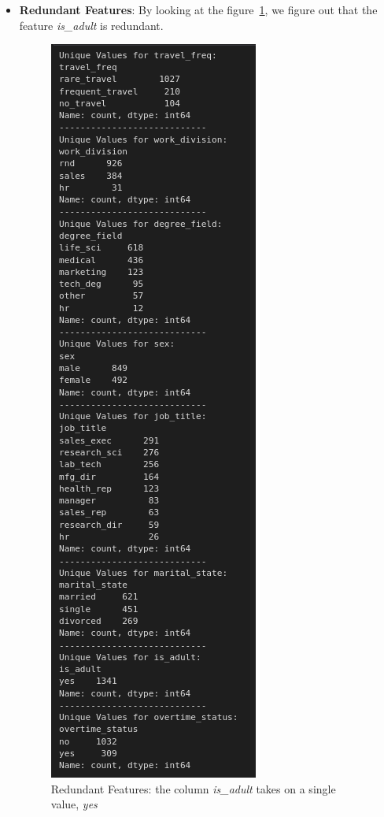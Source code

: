 \documentclass[a4paper,12pt]{article}
\begin{document}
\begin{itemize}
    \item \textbf{Redundant Features}: By looking at the figure~\ref{fig:fig_2}, we figure out that the feature \textit{is\_adult} is redundant.
    \begin{figure}[H]
    \centering
    \includegraphics[width=\textwidth, height=0.9\textheight, keepaspectratio]{./images/redundant_features.png}
    \caption{Redundant Features: the column \textit{is\_adult} takes on a single value, \textit{yes}}
    \label{fig:fig_2}
    \end{figure}


\end{itemize}
\end{document}
